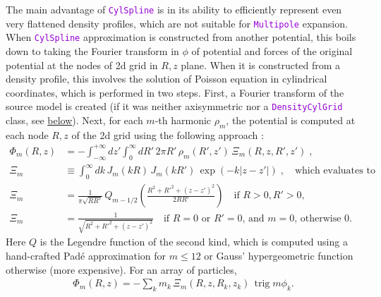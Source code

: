 \documentclass[12pt]{article}
\newcommand{\ttt}[1]{\textcolor{darkviolet}{\texttt{#1}}}
\DeclareMathOperator{\trig}{trig}
\begin{document}
The main advantage of \ttt{CylSpline} is in its ability to efficiently represent even very flattened density profiles, which are not suitable for \ttt{Multipole} expansion. When \ttt{CylSpline} approximation is constructed from another potential, this boils down to taking the Fourier transform in $\phi$ of potential and forces of the original potential at the nodes of 2d grid in $R,z$ plane. When it is constructed from a density profile, this involves the solution of Poisson equation in cylindrical coordinates, which is performed in two steps. First, a Fourier transform of the source model is created (if it was neither axisymmetric nor a \ttt{DensityCylGrid} class, see \hyperref[sec:DensityCylGrid]{below}). Next, for each $m$-th harmonic $\rho_m$, the potential is computed at each node $R,z$ of the 2d grid using the following approach \cite{CohlTohline1999}:
\begin{align}
\Phi_m(R,z) &= -\int_{-\infty}^{+\infty} dz' \int_0^{\infty} dR' \,2\pi R'\,\rho_m(R',z')  
  \,\Xi_m(R,z,R',z')\;,  \label{eq:PoissonCylindric} \\
\Xi_m &\equiv \int_0^\infty dk\, J_m(kR)\, J_m(kR')\, \exp(-k|z-z'|) \;,\quad
  \mbox{which evaluates to} \\
\Xi_m&= \frac{1}{\pi\sqrt{RR'}}\, Q_{m-1/2}\left( \frac{R^2+R'^2+(z-z')^2}{2RR'} \right) \quad
  \mbox{if }R>0,R'>0,  \nonumber \\
\Xi_m&= \frac{1}{\sqrt{R^2+R'^2+(z-z')^2}}\quad
  \mbox{if }R=0\mbox{ or }R'=0\mbox{, and }m=0\mbox{, otherwise 0}. \nonumber
\end{align}
Here $Q$ is the Legendre function of the second kind, which is computed using a hand-crafted Pad\'e approximation for $m\le 12$ or Gauss' hypergeometric function otherwise (more expensive).
For an array of particles, 
\begin{align}  \label{eq:PoissonCylindricParticles}
\Phi_m(R,z) = -\sum_k m_k\,\Xi_m(R,z,R_k,z_k)\,\trig m\phi_k .
\end{align}
\end{document}
